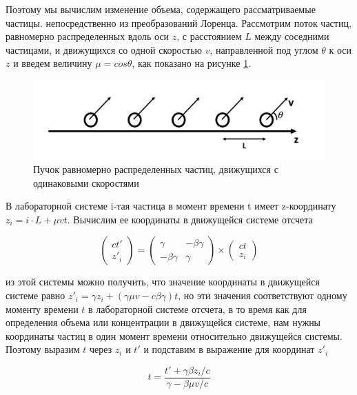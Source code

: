 Поэтому мы вычислим изменение объема, содержащего рассматриваемые частицы. непосредственно из преобразований Лоренца. Рассмотрим поток частиц, равномерно распределенных вдоль оси $z$, с расстоянием $L$ между соседними частицами, и движущихся со одной скоростью $v$, направленной под углом $\theta$ к оси $z$ и введем величину $\mu = cos \theta$, как показано на рисунке \ref{VolumeTransform}.

\begin{figure}[h]
	\centering
	\includegraphics[width=12.5 cm]{./fig/VolumeTransform.png} 
	\caption{Пучок равномерно распределенных частиц, движущихся с одинаковыми скоростями}
	\label{VolumeTransform}
\end{figure}

В лабораторной системе i-тая частица в момент времени t имеет z-координату $z_i = i\cdot L + \mu v t$. Вычислим ее координаты в движущейся системе отсчета

\begin{equation}\label{lorentz_z}
\left(\begin{array}{c}
ct'\\
z'_i
\end{array}
\right)
= \left(
\begin{array}{cc}
\gamma & -\beta\gamma\\
-\beta\gamma & \gamma
\end{array}
\right)
\times
\left(\begin{array}{c}
ct\\
z_i
\end{array}
\right)
\end{equation}  

из этой системы можно получить, что значение координаты в движущейся системе равно $z'_i = \gamma z_i + (\gamma \mu v - c\beta \gamma)t$, но эти значения соответствуют одному моменту времени $t$ в лабораторной системе отсчета, в то время как для определения объема или концентрации в движущейся системе, нам нужны координаты частиц в один момент времени относительно движущейся системы. Поэтому выразим $t$ через $z_i$ и $t'$ и подставим в выражение для координат $z'_i$

\begin{equation}
t=\frac{t'+\gamma\beta z_i/c}{\gamma - \beta \mu v/c}
\end{equation}

